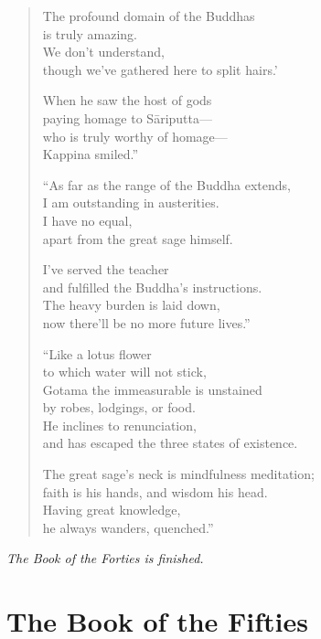 \documentclass[12pt,openany]{book}%
\let\oldcontentsline\contentsline
\newcommand{\nopagecontentsline}[3]{\oldcontentsline{#1}{#2}{}}
\newcommand*{\scendsection}[1]{\begin{center}\textit{#1}\end{center}}
\begin{document}
\begin{verse}
The profound domain of the Buddhas \\
is truly amazing. \\
We don’t understand, \\
though we’ve gathered here to split hairs.’ 

When he saw the host of gods \\
paying homage to \textsanskrit{Sāriputta}—\\
who is truly worthy of homage—\\
Kappina smiled.” 

“As far as the range of the Buddha extends, \\
I am outstanding in austerities. \\
I have no equal, \\
apart from the great sage himself. 

I’ve served the teacher \\
and fulfilled the Buddha’s instructions. \\
The heavy burden is laid down, \\
now there’ll be no more future lives.” 

“Like a lotus flower \\
to which water will not stick, \\
Gotama the immeasurable is unstained \\
by robes, lodgings, or food. \\
He inclines to renunciation, \\
and has escaped the three states of existence. 

The great sage’s neck is mindfulness meditation; \\
faith is his hands, and wisdom his head. \\
Having great knowledge, \\
he always wanders, quenched.” 

%
\end{verse}

\scendsection{The Book of the Forties is finished. }

%
\part*{The Book of the Fifties }
\markboth{}{}
\addtocontents{toc}{\let\protect\contentsline\protect\oldcontentsline}
\end{document}
